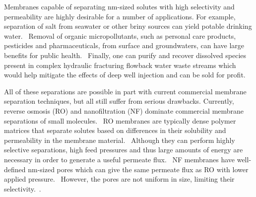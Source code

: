 \documentclass[journal=jpcbfk,manuscript=article]{achemso}
\begin{document}
  Membranes capable of separating nm-sized solutes with high selectivity and
  permeability are highly desirable for a number of applications. For example,
  separation of salt from seawater or other briny sources can yield potable
  drinking water.~\cite{fritzmann_state---art_2007} Removal of organic
  micropollutants, such as personal care products, pesticides and
  pharmaceuticals, from surface and groundwaters, can have large benefits for
  public health.~\cite{schwarzenbach_challenge_2006} Finally, one can purify and
  recover dissolved species present in complex hydraulic fracturing flowback
  water waste streams which would help mitigate the effects of deep well
  injection and can be sold for profit.~\cite{dischinger_application_2017} 

  All of these separations are possible in part with current commercial
  membrane separation techniques, but all still suffer from serious drawbacks.
  Currently, reverse osmosis (RO) and nanofiltration (NF) dominate commercial
  membrane separations of small molecules.~\cite{warsinger_review_2018} RO
  membranes are typically dense polymer matrices that separate solutes based on
  differences in their solubility and permeability in the membrane
  material.~\cite{fritzmann_state---art_2007} Although they can perform highly
  selective separations, high feed pressures and thus large amounts of energy are
  necessary in order to generate a useful permeate
  flux.~\cite{van_der_bruggen_review_2003} NF membranes have well-defined
  nm-sized pores which can give the same permeate flux as RO with lower applied
  pressure.~\cite{hilal_comprehensive_2004} However, the pores are not uniform in
  size, limiting their selectivity.~\cite{werber_materials_2016}.
  
\end{document}
